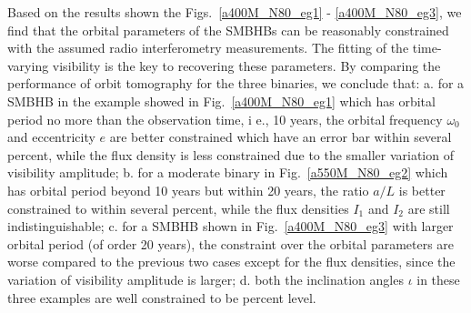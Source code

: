 \documentclass[twocolumn]{aastex62}
\begin{document}
Based on the results shown the Figs.~\ref{a400M_N80_eg1} - \ref{a400M_N80_eg3}, we find that the orbital  parameters of the SMBHBs can be reasonably constrained with the assumed radio interferometry measurements. The fitting of the time-varying visibility is the key to recovering these parameters. 
By comparing the performance of orbit tomography for the three binaries, we conclude that: a. for a SMBHB in the example showed in Fig.~\ref{a400M_N80_eg1} which has orbital period no more than the observation time, i e., 10 years, the orbital frequency $\omega_0$ and eccentricity $e$ are better constrained which have an error bar within several percent, while the flux density is less constrained due to the smaller variation of visibility amplitude; b. for a moderate binary in Fig.~\ref{a550M_N80_eg2} which has orbital period beyond 10 years but within 20 years, the ratio $a/L$ is better constrained to within several percent, while the flux densities $I_1$ and $I_2$ are still indistinguishable; c. for a SMBHB shown in Fig.~\ref{a400M_N80_eg3} with larger orbital period (of order 20 years), the constraint over the orbital parameters are worse compared to the previous two cases except for the flux densities, since the variation of visibility amplitude is larger; d. both the inclination angles $\iota$ in these three examples are well constrained to be percent level. 
\end{document}
